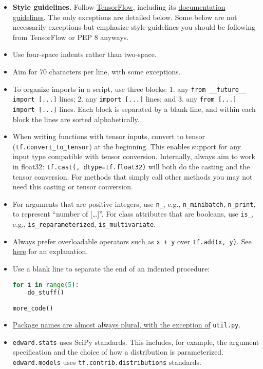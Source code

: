 \begin{itemize}
\item
  \textbf{Style guidelines.}
  Follow
  \href{https://www.tensorflow.org/versions/r0.9/how_tos/style_guide.html}{TensorFlow},
  including its
  \href{https://www.tensorflow.org/versions/r0.9/how_tos/documentation/index.html}{documentation guidelines}.
  The only exceptions are detailed below. Some below are not
  necessarily exceptions but emphasize style guidelines you
  should be following from TensorFlow or PEP 8 anyways.
\item
  Use four-space indents rather than two-space.
\item
  Aim for 70 characters per line, with some exceptions.
\item
  To organize imports in a script, use three blocks: 1. any \texttt{from __future__
  import [...]} lines; 2. any \texttt{import [...]} lines; and 3. any
  \texttt{from [...] import [...]} lines. Each block is separated by a blank line,
  and within each block the lines are sorted alphabetically.
\item
  When writing functions with tensor inputs, convert to
  tensor (\texttt{tf.convert_to_tensor}) at the beginning. This
  enables support for any input type compatible with tensor
  conversion. Internally, always aim to work in float32:
  \texttt{tf.cast(, dtype=tf.float32)} will both do the casting and the
  tensor conversion. For methods that simply call other methods you
  may not need this casting or tensor conversion.
\item
  For arguments that are positive integers, use \texttt{n\_}, e.g.,
  \texttt{n\_minibatch}, \texttt{n\_print}, to represent ``number of
  {[}\ldots{}{]}''.  For class attributes that are booleans, use
  \texttt{is_}, e.g., \texttt{is_reparameterized},
  \texttt{is_multivariate}.
\item
  Always prefer overloadable operators such as \texttt{x + y} over
  \texttt{tf.add(x, y)}. See
  \href{http://stackoverflow.com/questions/37900780/in-tensorflow-what-is-the-difference-between-tf-add-and-operator}{here}
  for an explanation.
\item
  Use a blank line to separate the end of an indented procedure:
\begin{lstlisting}[language=Python]
for i in range(5):
    do_stuff()

more_code()
\end{lstlisting}
\item
  \href{http://programmers.stackexchange.com/questions/75919/should-package-names-be-singular-or-plural}{Package
  names are almost always plural, with the exception of} \texttt{util.py}.
\item
  \texttt{edward.stats} uses SciPy standards. This
  includes, for example, the argument specification and the choice of
  how a distribution is parameterized. \texttt{edward.models}
  uses \texttt{tf.contrib.distributions} standards.
\end{itemize}


